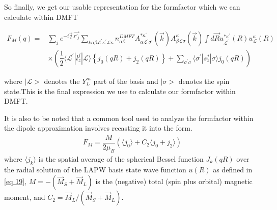 \documentclass[10pt]{ruthesis}
\begin{document}
{So finally, we get our usable representation for the formfactor which we can calculate within DMFT

\begin{equation} \label{eq 19}
\begin{split}
F_{M}(q)= & \sum_{j} e^{-i\vec{q}.\vec{r'_j}}   \sum_{k\alpha \beta \mathcal{L}^{'} \kappa^{'} \mathcal{L}\kappa} n^{DMFT}_{\alpha \beta} A^{* \kappa^{'}}_{\alpha \mathcal{L}^{'} \sigma^{'}}(\vec{k}) A^{ \kappa}_{\beta \mathcal{L}\sigma}(\vec{k}) \int d \vec{R}u_{\mathcal{L^{'}}}^{*\kappa^{'} }(R)u_{\mathcal{L}}^{\kappa}(R) \\
& \times\left( \dfrac{1}{2} \langle\mathcal{L^{'}}|l_{z}^j|\mathcal{L}\rangle \left\lbrace  j_{0}(qR) +j_{2}(qR) \right \rbrace + \sum_{\sigma^{'} \sigma} \langle \sigma^{'} |s_{z}^j|\sigma \rangle 
 j_0(qR) \right) 
\end{split}
\end{equation}

where $|\mathcal{L}>$ denotes the $Y_{L}^{m}$ part of the basis and $|\sigma>$ denotes the spin state.This is the final expression we use to calculate our formfactor within DMFT.

It is also to be noted that a common tool used to analyze the formfactor within the dipole approximation involves recasting it into the  form.
\begin{align}
F_{M}=\dfrac{M}{2 \mu_B} \left( \langle j_{0} \rangle + C_{2} \langle j_{0}+j_{2} \rangle \right) 
\end{align} 
where $\langle j_k \rangle$ is the spatial average of the spherical Bessel function
$J_k(qR)$ over the radial solution of the LAPW basis state wave function $u(R)$ as defined in \ref{eq 19},
$M=-(\vec{M}_S + \vec{M}_L)$ is the (negative) total (spin plus orbital) magnetic moment,
and $C_2 = \vec{M}_L/(\vec{M}_S + \vec{M}_L)$.

}
\end{document}
